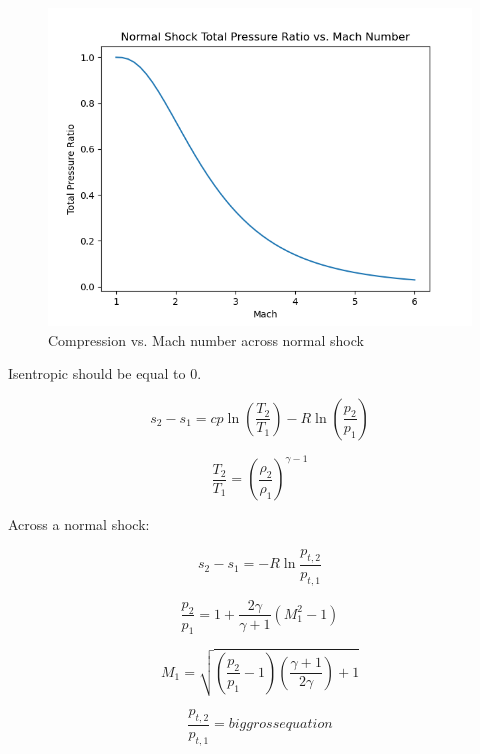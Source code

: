 \documentclass[../main.tex]{subfiles}
\begin{document}

\discussion{}

\begin{figure}[h]
    \centering
    \includegraphics{../../images/problem_1/compression_efficiency_NS.png}
    \caption{Compression vs. Mach number across normal shock}
\end{figure}


\solution{}

Isentropic should be equal to 0.

\[
    s_2 - s_1 = cp \ln{\left({\frac{T_2}{T_1}}\right)} - R \ln{\left({\frac{p_2}{p_1}}\right)}
\]

\[
    \frac{T_2}{T_1} = \left({\frac{\rho_2}{\rho_1}}\right)^{\gamma-1}
\]

Across a normal shock:

\[
    s_2 - s_1 = -R \ln {\frac{p_{t,2}}{p_{t,1}}}
\]

\[
    \frac{p_2}{p_1} = 1 + \frac{2\gamma}{\gamma+1}\left(M_1^2-1\right)
\]

\[
    M_1 = \sqrt{\left({\frac{p_2}{p_1} - 1}\right)\left({\frac{\gamma+1}{2\gamma}}\right) + 1}
\]

\[
    \frac{p_{t,2}}{p_{t,1}} = big gross equation
\]
\end{document}
